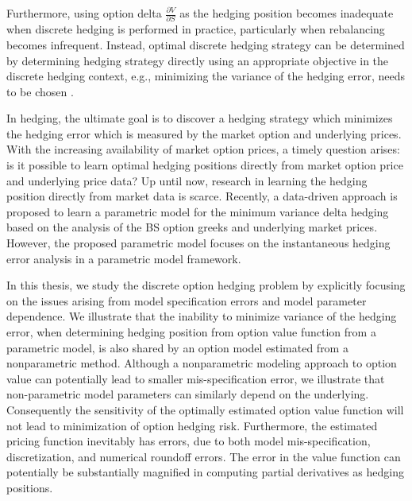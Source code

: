 \documentclass[letterpaper,12pt,titlepage,oneside,final]{book}
\numberwithin{equation}{section}
\theoremstyle{definition}
\begin{document}
Furthermore, using option delta $\frac{\partial V}{\partial S}$ as the hedging position becomes inadequate when discrete hedging is performed in practice, particularly when rebalancing becomes infrequent.  Instead, optimal discrete hedging strategy can be determined by determining hedging strategy directly using an appropriate objective in the discrete hedging context, e.g., minimizing the variance of the hedging error, needs to be chosen \citep{hulloptimal,Angelini10,Goutte13}.

In hedging, the ultimate goal is to discover a hedging strategy  which minimizes the hedging error which is  measured by the market option and underlying prices. With the increasing availability of market option prices, a timely question arises: is it possible to learn optimal hedging positions directly from market option price and underlying price data?
Up until now, research in learning the hedging position  directly from market data is scarce.
Recently, a data-driven approach  \citep{hulloptimal} is proposed to learn a parametric model for the minimum variance delta hedging based on the analysis of the BS option greeks and underlying market prices. However, the proposed parametric model focuses on the instantaneous hedging error analysis in a parametric model framework.


In this thesis, we study the discrete option hedging problem by  explicitly focusing on the issues arising from  model specification errors and model parameter dependence.
We illustrate that the inability to minimize variance of the hedging error, when determining hedging position from option value function from a parametric model, is also shared by an option model estimated from a nonparametric method. Although a nonparametric modeling approach to option value can potentially lead to smaller mis-specification error, we illustrate that non-parametric model parameters can similarly depend on the underlying. Consequently the sensitivity of the optimally estimated option value function will not lead to minimization of option hedging risk.
Furthermore,  the estimated pricing function inevitably has errors, due to both model mis-specification, discretization, and numerical roundoff errors.
The error in the value function can potentially be substantially magnified in computing partial derivatives as hedging positions.
\end{document}
